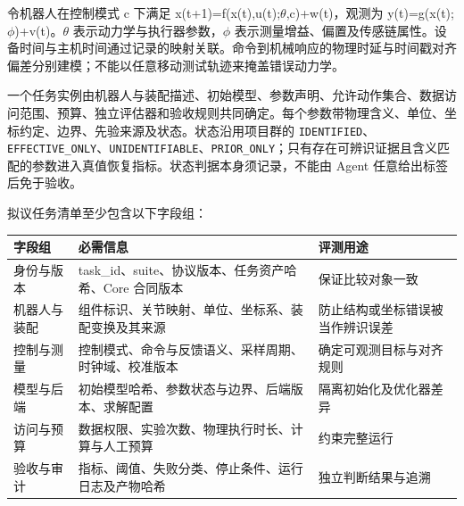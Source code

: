 \documentclass[
  chinese,
  11pt,
  a4paper,
  fontset=fandol]{ctexart}
\newcounter{none} %
\begin{document}
令机器人在控制模式 c 下满足
x(t+1)=f(x(t),u(t);\(\theta\),c)+w(t)，观测为
y(t)=g(x(t);\(\phi\))+v(t)。\(\theta\) 表示动力学与执行器参数，\(\phi\)
表示测量增益、偏置及传感链属性。设备时间与主机时间通过记录的映射关联。命令到机械响应的物理时延与时间戳对齐偏差分别建模；不能以任意移动测试轨迹来掩盖错误动力学。

一个任务实例由机器人与装配描述、初始模型、参数声明、允许动作集合、数据访问范围、预算、独立评估器和验收规则共同确定。每个参数带物理含义、单位、坐标约定、边界、先验来源及状态。状态沿用项目群的
\texttt{IDENTIFIED}、\texttt{EFFECTIVE\_ONLY}、\texttt{UNIDENTIFIABLE}、\texttt{PRIOR\_ONLY}；只有存在可辨识证据且含义匹配的参数进入真值恢复指标。状态判据本身须记录，不能由
Agent 任意给出标签后免于验收。

拟议任务清单至少包含以下字段组：

{\def\LTcaptype{none} %
\begin{longtable}[]{@{}
  >{\raggedright\arraybackslash}p{}
  >{\raggedright\arraybackslash}p{}
  >{\raggedright\arraybackslash}p{}@{}}
\toprule\noalign{}
\begin{minipage}[b]{\linewidth}\raggedright
字段组
\end{minipage} & \begin{minipage}[b]{\linewidth}\raggedright
必需信息
\end{minipage} & \begin{minipage}[b]{\linewidth}\raggedright
评测用途
\end{minipage} \\
\midrule\noalign{}
\endhead
\bottomrule\noalign{}
\endlastfoot
身份与版本 & task\_id、suite、协议版本、任务资产哈希、Core 合同版本 &
保证比较对象一致 \\
机器人与装配 & 组件标识、关节映射、单位、坐标系、装配变换及其来源 &
防止结构或坐标错误被当作辨识误差 \\
控制与测量 & 控制模式、命令与反馈语义、采样周期、时钟域、校准版本 &
确定可观测目标与对齐规则 \\
模型与后端 & 初始模型哈希、参数状态与边界、后端版本、求解配置 &
隔离初始化及优化器差异 \\
访问与预算 & 数据权限、实验次数、物理执行时长、计算与人工预算 &
约束完整运行 \\
验收与审计 & 指标、阈值、失败分类、停止条件、运行日志及产物哈希 &
独立判断结果与追溯 \\
\end{longtable}
}
\end{document}
